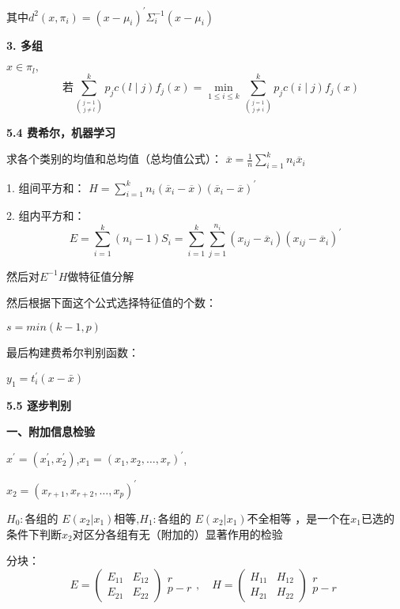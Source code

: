 \documentclass[10pt,a4paper]{ctexart} %
\begin{document}
\begin{multicols*}{3}
		其中$d^2(x,\pi_i)=(x-\mu_i)^{'}\Sigma_i^{-1}(x-\mu_i)$
		
		\textbf{3. 多组}
		
		$x\in\pi_l,$
		$$\quad\text{若}\sum_{\binom{j=1}{j\neq l}}^kp_jc\left(l\mid j\right)f_j\left(x\right)=\min_{1\leqslant i\leqslant k}\sum_{\binom{j=1}{j\neq i}}^kp_jc\left(i\mid j\right)f_j\left(x\right)$$
		
		\textbf{5.4 费希尔，机器学习}
		
		求各个类别的均值和总均值（总均值公式）：
		$\overline{x}=\frac{1}{n}\sum_{i=1}^{k}n_{i}\overline{x}_{i}$
		
		1. 组间平方和：
		$H=\sum_{i=1}^{k}n_{i}\left(\overline{x}_{i}-\overline{x}\right)\left(\overline{x}_{i}-\overline{x}\right)^{\prime}$
		
		2. 组内平方和：
		$$E=\sum_{i=1}^{k}\left(n_{i}-1\right)S_{i}=\sum_{i=1}^{k}\sum_{j=1}^{n_{i}}\left(x_{ij}-\overline{x}_{i}\right)\left(x_{ij}-\overline{x}_{i}\right)^{\prime}$$
		
		然后对$E^{-1}H$做特征值分解
		
		然后根据下面这个公式选择特征值的个数：
		
		$s=min(k-1,p)$
		
		最后构建费希尔判别函数：
		
		$y_1 = t_i^{'}(x-\bar{x})$
		
		\textbf{5.5 逐步判别}
		
		\textbf{一、附加信息检验}
		
		$x^{\prime}=(x^{\prime}_1,x^{\prime}_2)$,$x_1=(x_1,x_2,\dots,x_r)^{\prime}$,
		
		$x_2=(x_{r+1},x_{r+2},\dots,x_p)^{\prime}$
		
		$H_0:\text{各组的 }E(x_2|x_1)\text{相等,}H_1:\text{各组的 }E(x_2|x_1)\text{不全相等}$
		，是一个在$x_1$已选的条件下判断$x_2$对区分各组有无（附加的）显著作用的检验
		
		分块：
		\[
		E = \begin{pmatrix}
			E_{11} & E_{12} \\
			E_{21} & E_{22}
		\end{pmatrix}
		\begin{array}{c}
			r \\
			p - r
		\end{array}, \quad
		H = \begin{pmatrix}
			H_{11} & H_{12} \\
			H_{21} & H_{22}
		\end{pmatrix}
		\begin{array}{c}
			r \\
			p - r
		\end{array}
		\]
		

\end{multicols*}
\end{document}
